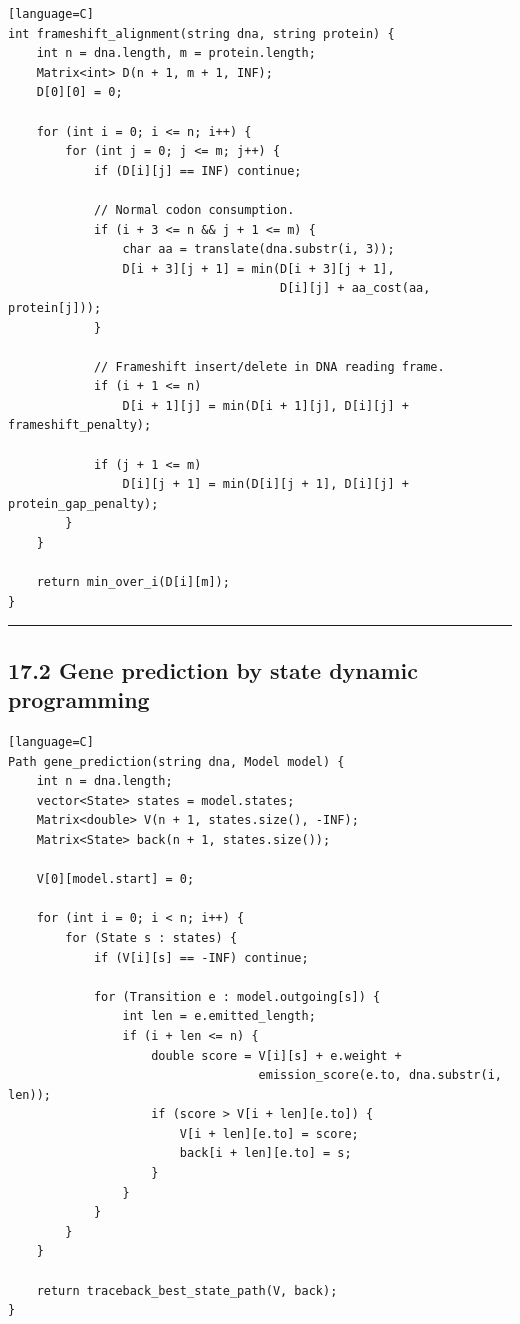 \documentclass[11pt]{article}
\begin{document}
\begin{verbatim}[language=C]
int frameshift_alignment(string dna, string protein) {
    int n = dna.length, m = protein.length;
    Matrix<int> D(n + 1, m + 1, INF);
    D[0][0] = 0;

    for (int i = 0; i <= n; i++) {
        for (int j = 0; j <= m; j++) {
            if (D[i][j] == INF) continue;

            // Normal codon consumption.
            if (i + 3 <= n && j + 1 <= m) {
                char aa = translate(dna.substr(i, 3));
                D[i + 3][j + 1] = min(D[i + 3][j + 1],
                                      D[i][j] + aa_cost(aa, protein[j]));
            }

            // Frameshift insert/delete in DNA reading frame.
            if (i + 1 <= n)
                D[i + 1][j] = min(D[i + 1][j], D[i][j] + frameshift_penalty);

            if (j + 1 <= m)
                D[i][j + 1] = min(D[i][j + 1], D[i][j] + protein_gap_penalty);
        }
    }

    return min_over_i(D[i][m]);
}
\end{verbatim}

\begin{center}\rule{0.5\linewidth}{0.5pt}\end{center}

\subsection{17.2 Gene prediction by state dynamic programming}\label{gene-prediction-by-state-dynamic-programming}

\begin{verbatim}[language=C]
Path gene_prediction(string dna, Model model) {
    int n = dna.length;
    vector<State> states = model.states;
    Matrix<double> V(n + 1, states.size(), -INF);
    Matrix<State> back(n + 1, states.size());

    V[0][model.start] = 0;

    for (int i = 0; i < n; i++) {
        for (State s : states) {
            if (V[i][s] == -INF) continue;

            for (Transition e : model.outgoing[s]) {
                int len = e.emitted_length;
                if (i + len <= n) {
                    double score = V[i][s] + e.weight +
                                   emission_score(e.to, dna.substr(i, len));
                    if (score > V[i + len][e.to]) {
                        V[i + len][e.to] = score;
                        back[i + len][e.to] = s;
                    }
                }
            }
        }
    }

    return traceback_best_state_path(V, back);
}
\end{verbatim}
\end{document}
